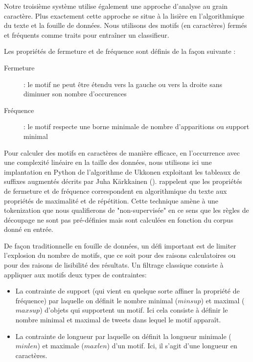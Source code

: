  Notre troisième système utilise également une approche d'analyse au grain caractère. Plus exactement cette approche se situe à la lisière en l'algorithmique du texte et la fouille de données.
 Nous utilisons des motifs (en caractères) fermés et fréquents comme traits pour entraîner un classifieur.

 Les propriétés de fermeture et de fréquence sont définis de la façon suivante :%
\begin{description}
\item[Fermeture]: le motif ne peut être étendu vers la gauche ou vers la droite sans diminuer son nombre d'occurences
\item[Fréquence]: le motif respecte une borne minimale de nombre d'apparitions ou support minimal
\end{description}

 Pour calculer des motifs en caractères de manière efficace, en l'occurrence avec une complexité linéaire en la taille des données, nous utilisons ici une implantation en Python de l'algorithme de Ukkonen \cite{Ukkonen-2009} exploitant les tableaux de suffixes augmentés décrits par Juha Kärkkainen (\cite{Karkka-2006}).
 \cite{Buscaldi-2017} rappelent que les propriétés de fermeture et de fréquence correspondent en algorithmique du texte aux propriétés de maximalité et de répétition.
 Cette technique amène à une tokenization que nous qualifierons de "non-supervisée" en ce sens que les règles de découpage ne sont pas pré-définies mais sont calculées en fonction du corpus donné en entrée.%
 
 De façon traditionnelle en fouille de données, un défi important est de limiter l'explosion du nombre de motifs, que ce soit pour des raisons calculatoires ou pour des raisons de lisibilité des résultats.%
 Un filtrage classique consiste à appliquer aux motifs deux types de contraintes:
\begin{itemize}
  \item La contrainte de support (qui vient en quelque sorte affiner la propriété de fréquence) par laquelle on définit le nombre minimal ($minsup$) et maximal ($maxsup$) d'objets qui supportent un motif. Ici cela consiste à définir le nombre minimal et maximal de tweets dans lequel le motif apparaît.
  \item La contrainte de longueur par laquelle on définit la longueur minimale ($minlen$) et maximale ($maxlen$) d'un motif. Ici, il s'agit d'une longueur en caractères.
\end{itemize}


